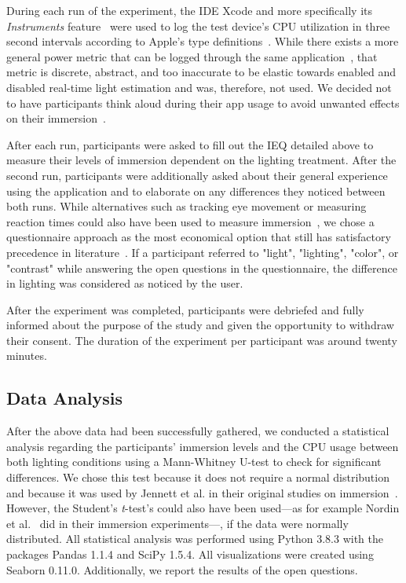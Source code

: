 \documentclass[12pt,twoside,english]{article}
\begin{document}
During each run of the experiment, the \gls{IDE} Xcode and more specifically its \textit{Instruments} feature~\cite{apple_xcode_2020} were used to log the test device's \gls{CPU} utilization in three second intervals according to Apple's type definitions~\cite{apple_system_2020}.
While there exists a more general power metric that can be logged through the same application~\cite{apple_energy_2020-1}, that metric is discrete, abstract, and too inaccurate to be elastic towards enabled and disabled real-time light estimation and was, therefore, not used.
We decided not to have participants think aloud during their app usage to avoid unwanted effects on their immersion~\cite{van_den_haak_retrospective_2003}.

After each run, participants were asked to fill out the \gls{IEQ} detailed above to measure their levels of immersion dependent on the lighting treatment.
After the second run, participants were additionally asked about their general experience using the application and to elaborate on any differences they noticed between both runs.
While alternatives such as tracking eye movement or measuring reaction times could also have been used to measure immersion~\cite{jennett_measuring_2008}, we chose a questionnaire approach as the most economical option that still has satisfactory precedence in literature~\cite{boyle_engagement_2012}.
If a participant referred to "light", "lighting", "color", or "contrast" while answering the open questions in the questionnaire, the difference in lighting was considered as noticed by the user.

After the experiment was completed, participants were debriefed and fully informed about the purpose of the study and given the opportunity to withdraw their consent.
The duration of the experiment per participant was around twenty minutes.

\subsection{Data Analysis}
\label{sect:data_analysis}

After the above data had been successfully gathered, we conducted a statistical analysis regarding the participants' immersion levels and the \gls{CPU} usage between both lighting conditions using a Mann-Whitney U-test to check for significant differences.
We chose this test because it does not require a normal distribution and because it was used by Jennett et al. in their original studies on immersion~\cite{jennett_measuring_2008}.
However, the Student's \textit{t}-test's could also have been used---as for example Nordin et al.~\cite{nordin_attention_2013} did in their immersion experiments---, if the data were normally distributed.
All statistical analysis was performed using Python 3.8.3 with the packages Pandas 1.1.4 and SciPy 1.5.4.
All visualizations were created using Seaborn 0.11.0.
Additionally, we report the results of the open questions.
\end{document}

